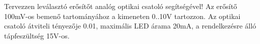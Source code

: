\begin{example}

Tervezzen leválasztó erősítőt analóg optikai csatoló segítségével! Az erősítő 100mV-os bemenő tartományához a kimeneten 0..10V tartozzon.
Az optikai csatoló átviteli tényezője 0.01, maximális LED árama 20mA, a rendelkezésre álló tápfeszültség 15V-os.


\tcbline
\vspace{1mm}

\solution

\end{example}